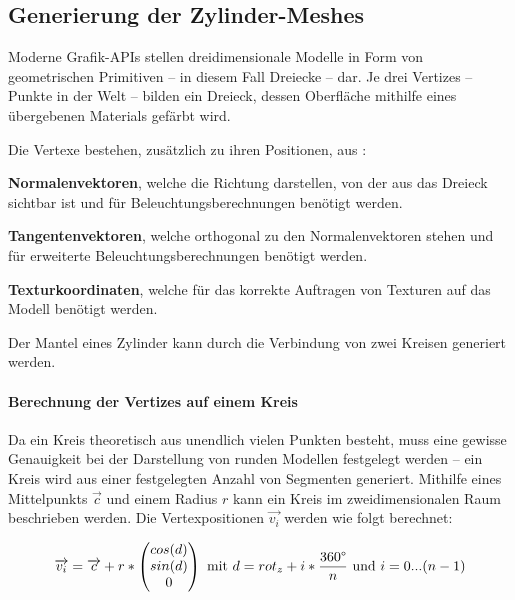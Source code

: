 \subsection{Generierung der Zylinder-Meshes} \label{subsec:ZylinderMeshes}

Moderne Grafik-APIs stellen dreidimensionale Modelle in Form von geometrischen Primitiven -- in diesem Fall Dreiecke -- dar. Je drei Vertizes -- Punkte in der Welt -- bilden ein Dreieck, dessen Oberfläche mithilfe eines übergebenen Materials gefärbt wird.

Die Vertexe bestehen, zusätzlich zu ihren Positionen, aus :

\begin{description}
	\item \textbf{Normalenvektoren}, welche die Richtung darstellen, von der aus das Dreieck sichtbar ist und für Beleuchtungsberechnungen benötigt werden. \cite{ModelingByNumbers1A:13} 
	\item \textbf{Tangentenvektoren}, welche orthogonal zu den Normalenvektoren stehen und für erweiterte Beleuchtungsberechnungen benötigt werden.
	\item \textbf{Texturkoordinaten}, welche für das korrekte Auftragen von Texturen auf das Modell benötigt werden. \cite{ModelingByNumbers1A:13} 
\end{description}


Der Mantel eines Zylinder kann durch die Verbindung von zwei Kreisen generiert werden. 

\paragraph{Berechnung der Vertizes auf einem Kreis}

Da ein Kreis theoretisch aus unendlich vielen Punkten besteht, muss eine gewisse Genauigkeit bei der Darstellung von runden Modellen festgelegt werden -- ein Kreis wird aus einer festgelegten Anzahl von Segmenten generiert. Mithilfe eines Mittelpunkts $\overrightarrow{c}$ und  einem Radius $r$ kann ein Kreis im zweidimensionalen Raum beschrieben werden. Die Vertexpositionen $\overrightarrow{v_i}$ werden wie folgt berechnet:

\begin{equation}
	\overrightarrow{v_i} =\overrightarrow{c} + r * \begin{pmatrix}
	cos(d)\\
	sin(d)\\
	0
	\end{pmatrix}
	\text{ mit } d = rot_z + i * \frac{360\degree}{n} \text{ und } i = 0 ... (n-1)
\end{equation}
\cite{ModelingByNumbersZylindersA:13}

